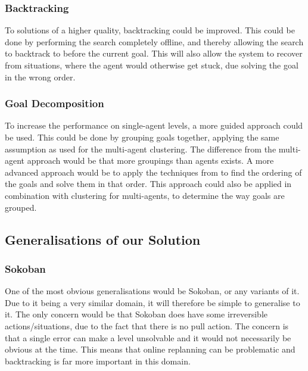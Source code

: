 \documentclass[letterpaper]{article}
\begin{document}
		\subsubsection{Backtracking}
		\label{subsub:backtrack}
			To solutions of a higher quality, backtracking could be improved. This could be done by performing the search completely offline, and thereby allowing the search to backtrack to before the current goal. This will also allow the system to recover from situations, where the agent would otherwise get stuck, due solving the goal in the wrong order.
			


		\subsubsection{Goal Decomposition}
			To increase the performance on single-agent levels, a more guided approach could be used. This could be done by grouping goals together, applying the same assumption as used for the multi-agent clustering. The difference from the multi-agent approach would be that more groupings than agents exists. A more advanced approach would be to apply the techniques from \cite{Subgoals} to find the ordering of the goals and solve them in that order. This approach could also be applied in combination with clustering for multi-agents, to determine the way goals are grouped.

			

	\subsection{Generalisations of our Solution}


		
		\subsubsection{Sokoban}
			One of the most obvious generalisations would be Sokoban, or any variants of it. Due to it being a very similar domain, it will therefore be simple to generalise to it. The only concern would be that Sokoban does have some irreversible actions/situations, due to the fact that there is no pull action. The concern is that a single error can make a level unsolvable and it would not necessarily be obvious at the time. This means that online replanning can be problematic and backtracking is far more important in this domain.
\end{document}
